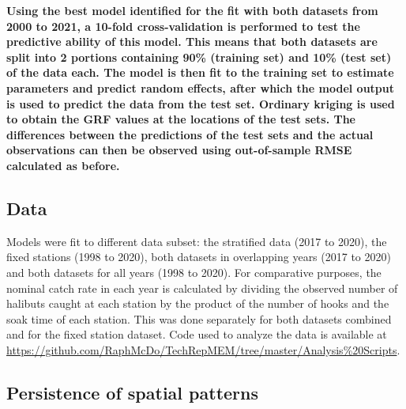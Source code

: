 \documentclass[12pt]{article}\usepackage[]{graphicx}\usepackage[]{color}
\begin{document}
\textbf{Using the best model identified for the fit with both datasets from 2000 to 2021, a 10-fold cross-validation is performed to test the predictive ability of this model. This means that both datasets are split into 2 portions containing 90\% (training set) and 10\% (test set) of the data each. The model is then fit to the training set to estimate parameters and predict random effects, after which the model output is used to predict the data from the test set. Ordinary kriging is used to obtain the GRF values at the locations of the test sets. The differences between the predictions of the test sets and the actual observations can then be observed using out-of-sample RMSE calculated as before.}

\hypertarget{data}{%
\subsection{Data}\label{data}}

Models were fit to different data subset: the stratified data (2017 to 2020), the fixed stations (1998 to 2020), both datasets in overlapping years (2017 to 2020) and both datasets for all years (1998 to 2020). For comparative purposes, the nominal catch rate in each year is calculated by dividing the observed number of halibuts caught at each station by the product of the number of hooks and the soak time of each station. This was done separately for both datasets combined and for the fixed station dataset. Code used to analyze the data is available at \url{https://github.com/RaphMcDo/TechRepMEM/tree/master/Analysis\%20Scripts}.

\hypertarget{persistence-of-spatial-patterns}{%
\subsection{Persistence of spatial patterns}\label{persistence-of-spatial-patterns}}
\end{document}

